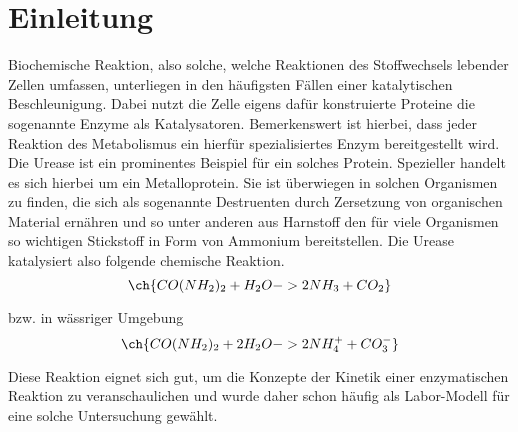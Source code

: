 %
%

\section{Einleitung}
Biochemische Reaktion, also solche, welche Reaktionen des Stoffwechsels lebender Zellen umfassen, unterliegen in den häufigsten Fällen einer katalytischen Beschleunigung. Dabei nutzt die Zelle eigens dafür konstruierte Proteine die sogenannte Enzyme als Katalysatoren. Bemerkenswert ist hierbei, dass jeder Reaktion des Metabolismus ein hierfür spezialisiertes Enzym bereitgestellt wird. Die Urease ist ein prominentes Beispiel für ein solches Protein. Spezieller handelt es sich hierbei um ein Metalloprotein. Sie ist überwiegen in solchen Organismen zu finden, die sich als sogenannte Destruenten durch Zersetzung von organischen Material ernähren und so unter anderen aus Harnstoff den für viele Organismen so wichtigen Stickstoff in Form von Ammonium bereitstellen. Die Urease katalysiert also folgende chemische Reaktion.
\begin{equation}
\ch{CO(NH_2)_2 +  H_2O -> 2 NH_3 + CO_2}
\end{equation}

bzw. in wässriger Umgebung 
\begin{equation}
\ch{CO(NH_2)_2 + 2 H_2O -> 2 NH_4^+ + CO_3^-}
\end{equation}

Diese Reaktion eignet sich gut, um die Konzepte der Kinetik einer enzymatischen Reaktion zu veranschaulichen und wurde daher schon häufig als Labor-Modell für eine solche Untersuchung gewählt.
